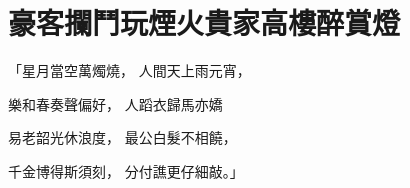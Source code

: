 %

\chapter{豪客攔鬥玩煙火\KG 貴家高樓醉賞燈}


\begin{showcontents}{}



「星月當空萬燭燒，  人間天上雨元宵，

樂和春奏聲偏好，  人蹈衣歸馬亦嬌

易老韶光休浪度，  最公白髮不相饒，

千金博得斯須刻，  分付譙更仔細敲。」


\end{showcontents}
